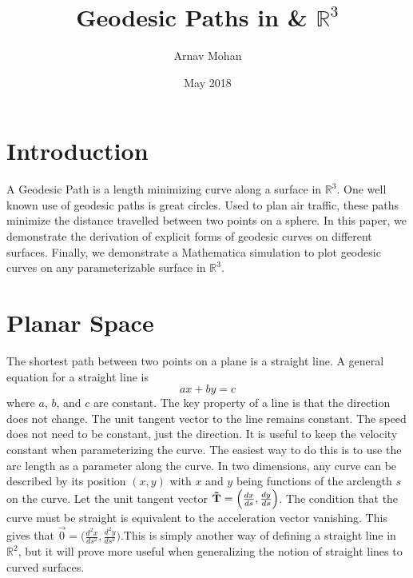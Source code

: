 \documentclass{article}
\title{Geodesic Paths in & $\mathbb{R}^3$}
\author{Arnav Mohan }
\date{May 2018}
\begin{document}
\maketitle

\section{Introduction}
A Geodesic Path is a length minimizing curve along a surface in $\mathbb{R}^3$. One  well known use of geodesic paths is great circles. Used to plan air traffic, these paths minimize the distance travelled between two points on a sphere. In this paper, we demonstrate the derivation of explicit forms of geodesic curves on different surfaces. Finally, we demonstrate a Mathematica simulation to plot geodesic curves on any parameterizable surface in $\mathbb{R}^3$.

\section{Planar Space}
The shortest path between two points on a plane is a straight line. A general equation for a straight line is 
\begin{equation}
    ax+by=c
\end{equation}
where $a$, $b$, and $c$ are constant. The key property of a line is that the direction does not change. The unit tangent vector to the line remains constant. The speed does not need to be constant, just the direction. It is useful to keep the velocity constant when parameterizing the curve. The easiest way to do this is to use the arc length as a parameter along the curve. In two dimensions, any curve can be described by its position $(x,y)$ with $x$ and $y$ being functions of the arclength $s$ on the curve. Let the unit tangent vector $\bold{\vec{T}} = \Big(\frac{dx}{ds}, \frac{dy}{ds}\Big)$. The condition that the curve must be straight is equivalent to the acceleration vector vanishing. This gives that $\vec{0} = \Big(\frac{d^2 x}{ds^2}, \frac{d^2 y}{ds^2}\Big)$.This is simply another way of defining a straight line in $\mathbb{R}^2$, but it will prove more useful when generalizing the notion of straight lines to curved surfaces.
\end{document}
